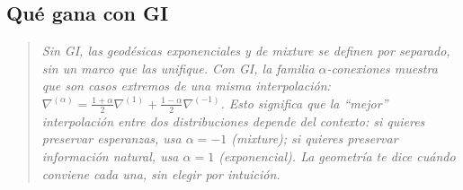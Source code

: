 \subsection*{Qué gana con GI}
\begin{quote}
	\itshape
	Sin GI, las geodésicas exponenciales y de mixture se definen por separado, sin un marco que las unifique.  Con GI, la familia $\alpha$-conexiones muestra que son casos extremos de una misma interpolación: $\nabla^{(\alpha)} = \frac{1+\alpha}{2} \nabla^{(1)} + \frac{1-\alpha}{2} \nabla^{(-1)}$.  Esto significa que la ``mejor'' interpolación entre dos distribuciones depende del contexto: si quieres preservar esperanzas, usa $\alpha = -1$ (mixture); si quieres preservar información natural, usa $\alpha = 1$ (exponencial).  La geometría te dice cuándo conviene cada una, sin elegir por intuición.
\end{quote}
